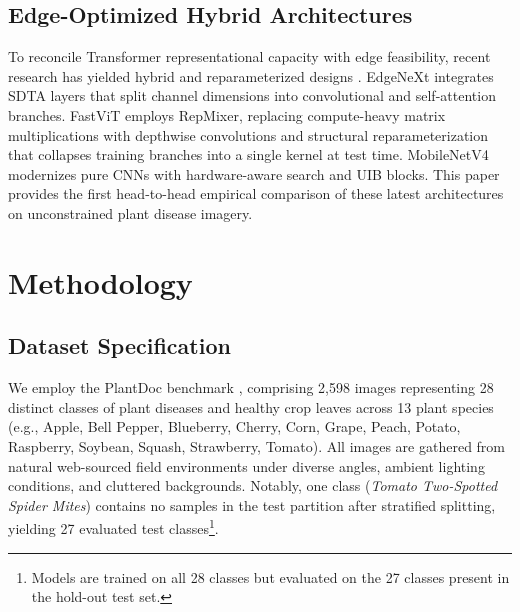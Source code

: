 \documentclass[conference]{IEEEtran}
\begin{document}
\subsection{Edge-Optimized Hybrid Architectures}
To reconcile Transformer representational capacity with edge feasibility, recent research has yielded hybrid and reparameterized designs \cite{convnext, edgenext, fastvit, mobilenetv4}. EdgeNeXt \cite{edgenext} integrates SDTA layers that split channel dimensions into convolutional and self-attention branches. FastViT \cite{fastvit} employs RepMixer, replacing compute-heavy matrix multiplications with depthwise convolutions and structural reparameterization that collapses training branches into a single kernel at test time. MobileNetV4 \cite{mobilenetv4} modernizes pure CNNs with hardware-aware search and UIB blocks. This paper provides the first head-to-head empirical comparison of these latest architectures on unconstrained plant disease imagery.

\section{Methodology}

\subsection{Dataset Specification}
We employ the PlantDoc benchmark \cite{plantdoc}, comprising 2,598 images representing 28 distinct classes of plant diseases and healthy crop leaves across 13 plant species (e.g., Apple, Bell Pepper, Blueberry, Cherry, Corn, Grape, Peach, Potato, Raspberry, Soybean, Squash, Strawberry, Tomato). All images are gathered from natural web-sourced field environments under diverse angles, ambient lighting conditions, and cluttered backgrounds. Notably, one class (\textit{Tomato Two-Spotted Spider Mites}) contains no samples in the test partition after stratified splitting, yielding 27 evaluated test classes\footnote{Models are trained on all 28 classes but evaluated on the 27 classes present in the hold-out test set.}.
\end{document}
